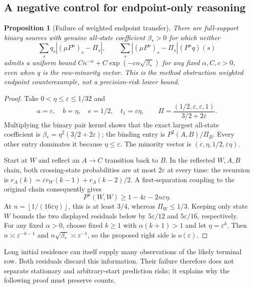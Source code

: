 \documentclass[11pt,letterpaper]{article}
\newtheorem{proposition}[theorem]{Proposition}
\theoremstyle{definition}\newtheorem{definition}[theorem]{Definition}
\theoremstyle{remark}\newtheorem{remark}[theorem]{Remark}
\newcommand{\floor}[1]{\left\lfloor #1\right\rfloor}
\begin{document}
\subsection{A negative control for endpoint-only reasoning}
\begin{proposition}[Failure of weighted endpoint transfer]\label{prop:mixingfailure}
There are full-support binary sources with genuine all-state coefficient $\beta_*>0$ for which neither
\[
 \sum_s q_s|(\mu P^n)_s-\Pi_s|,
 \qquad
 \sum_s|(\mu P^n)_s-\Pi_s|(P^nq)(s)
\]
admits a uniform bound
$C n^{-\alpha}+C\exp(-cn\sqrt{\beta_*})$
for any fixed $\alpha,C,c>0$, even when $q$ is the row-minority vector. This is the method obstruction weighted endpoint counterexample, not a precision-risk lower bound.
\end{proposition}
\begin{proof}
Take $0<\eta\le\varepsilon\le1/32$ and
\[
 a=\varepsilon,\quad b=\eta,\quad e=1/2,\quad t_1=\varepsilon\eta,
 \qquad
 \Pi=\frac{(1/2,\varepsilon,\varepsilon,1)}{3/2+2\varepsilon}.
\]
Multiplying the binary pair kernel shows that the exact largest all-state coefficient is
$\beta_*=\eta^2(3/2+2\varepsilon)$; the binding entry is $P^2(A,B)/\Pi_B$. Every other entry dominates it because $\eta\le\varepsilon$. The minority vector is $(\varepsilon,\eta,1/2,\varepsilon\eta)$.

Start at $W$ and reflect an $A\to C$ transition back to $B$. In the reflected $W,A,B$ chain, both crossing-state probabilities are at most $2\varepsilon$ at every time: the recursion is
$r_A(k)=\varepsilon r_W(k-1)+r_A(k-2)/2$.
A first-separation coupling to the original chain consequently gives
\[
 P^n(W,W)\ge1-4\varepsilon-2n\varepsilon\eta .
\]
At $n=\floor{1/(16\varepsilon\eta)}$, this is at least $3/4$, whereas $\Pi_W\le1/3$. Keeping only state $W$ bounds the two displayed residuals below by $5\varepsilon/12$ and $5\varepsilon/16$, respectively. For any fixed $\alpha>0$, choose fixed $k\ge1$ with $\alpha(k+1)>1$ and let $\eta=\varepsilon^k$. Then
$n\asymp\varepsilon^{-k-1}$ and $n\sqrt{\beta_*}\asymp\varepsilon^{-1}$, so the proposed right side is $o(\varepsilon)$.
\end{proof}

Long initial residence can itself supply many observations of the likely terminal row. Both residuals discard this information. Their failure therefore does not separate stationary and arbitrary-start prediction risks; it explains why the following proof must preserve counts.
\end{document}
